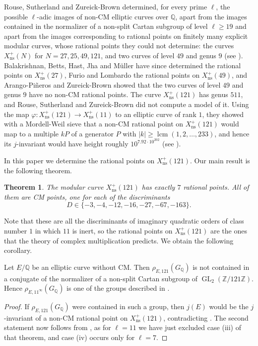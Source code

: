 \documentclass[11pt,reqno]{amsart}
\DeclareMathOperator{\GL}{GL}
\DeclareMathOperator{\lcm}{lcm}
\newcommand{\Q}{\mathbb{Q}}
\newcommand{\Z}{\mathbb{Z}}
\newcommand{\ns}{\mathrm{ns}}
\newcommand{\Xns}[1]{X_{\ns}^+(#1)}
\newtheorem{theorem}{Theorem}[section]
\theoremstyle{definition}
\numberwithin{equation}{section}
\begin{document}
Rouse, Sutherland and Zureick-Brown \cite{RSZB22} determined, for every prime $\ell$, the possible $\ell$-adic images of non-CM elliptic curves over $\Q$, apart from the images contained in the normalizer of a non-split Cartan subgroup of level $\ell\geq 19$ and apart from the images corresponding to rational points on finitely many explicit modular curves, whose rational points they could not determine: the curves $\Xns{N}$ for $N=27, 25, 49, 121$, and two curves of level $49$ and genus $9$ (see \cite[Theorem 1.6]{RSZB22}). Balakrishnan, Betts, Hast, Jha and M\"uller \cite{BBHJM25} have since determined the rational points on $\Xns{27}$, Furio and Lombardo \cite{FL25} the rational points on $\Xns{49}$, and Arango-Pi\~neros and Zureick-Brown \cite{APZB26} showed that the two curves of level $49$ and genus $9$ have no non-CM rational points. The curve $\Xns{121}$ has genus $511$, and Rouse, Sutherland and Zureick-Brown did not compute a model of it. Using the map $\varphi:\Xns{121}\rightarrow \Xns{11}$ to an elliptic curve of rank $1$, they showed with a Mordell-Weil sieve that a non-CM rational point on $\Xns{121}$ would map to a multiple $kP$ of a generator $P$ with $|k|\geq \lcm(1,2,\ldots,233)$, and hence its $j$-invariant would have height roughly $10^{7.92\cdot 10^{202}}$ (see \cite[Section 9.2]{RSZB22}).

In this paper we determine the rational points on $\Xns{121}$. Our main result is the following theorem.

\begin{theorem}\label{thm:main}
The modular curve $\Xns{121}$ has exactly $7$ rational points. All of them are CM points, one for each of the discriminants
$$D\in\{-3,-4,-12,-16,-27,-67,-163\}.$$
\end{theorem}

Note that these are all the discriminants of imaginary quadratic orders of class number $1$ in which $11$ is inert, so the rational points on $\Xns{121}$ are the ones that the theory of complex multiplication predicts. We obtain the following corollary.

\begin{corollary}\label{cor:images}
Let $E/\Q$ be an elliptic curve without CM. Then $\rho_{E,121}(G_\Q)$ is not contained in a conjugate of the normalizer of a non-split Cartan subgroup of $\GL_2(\Z/121\Z)$. Hence $\rho_{E,11^\infty}(G_\Q)$ is one of the groups described in \cite[Theorem 1.6 (i) and (ii)]{RSZB22}.
\end{corollary}

\begin{proof}
If $\rho_{E,121}(G_\Q)$ were contained in such a group, then $j(E)$ would be the $j$-invariant of a non-CM rational point on $\Xns{121}$, contradicting . The second statement now follows from \cite[Theorem 1.6]{RSZB22}, as for $\ell=11$ we have just excluded case (iii) of that theorem, and case (iv) occurs only for $\ell=7$.
\end{proof}
\end{document}
